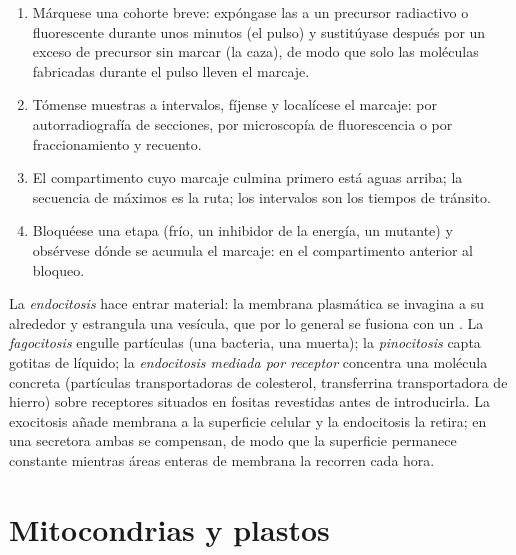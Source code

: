 \begin{method}\label{met:b1:eukaryotic-cell:pulsechase}
\begin{enumerate}
  \item Márquese una cohorte breve: expóngase las  a un precursor
        radiactivo o fluorescente durante unos minutos (el pulso) y
        sustitúyase después por un exceso de precursor sin marcar (la
        caza), de modo que solo las moléculas fabricadas durante el pulso
        lleven el marcaje.
  \item Tómense muestras a intervalos, fíjense y localícese el marcaje: por
        autorradiografía de secciones, por microscopía de fluorescencia o
        por fraccionamiento y recuento.
  \item El compartimento cuyo marcaje culmina primero está aguas arriba; la
        secuencia de máximos es la ruta; los intervalos son los tiempos de
        tránsito.
  \item Bloquéese una etapa (frío, un inhibidor de la energía, un mutante) y
        obsérvese dónde se acumula el marcaje: en el compartimento anterior
        al bloqueo.
\end{enumerate}
\end{method}

\begin{definition}[Endocitosis]\label{def:b1:eukaryotic-cell:endocytosis}
La \emph{endocitosis} hace entrar material: la membrana
plasmática se invagina a su alrededor y estrangula una vesícula, que por lo
general se fusiona con un . La \emph{fagocitosis} engulle partículas
(una bacteria, una  muerta); la \emph{pinocitosis} capta gotitas de
líquido; la \emph{endocitosis mediada por receptor} concentra una molécula
concreta (partículas transportadoras de colesterol, transferrina
transportadora de hierro) sobre receptores situados en fositas revestidas
antes de introducirla. La exocitosis añade membrana a la superficie celular
y la endocitosis la retira; en una  secretora ambas se compensan, de
modo que la superficie permanece constante mientras áreas enteras de
membrana la recorren cada hora.
\end{definition}

\section{Mitocondrias y plastos}

